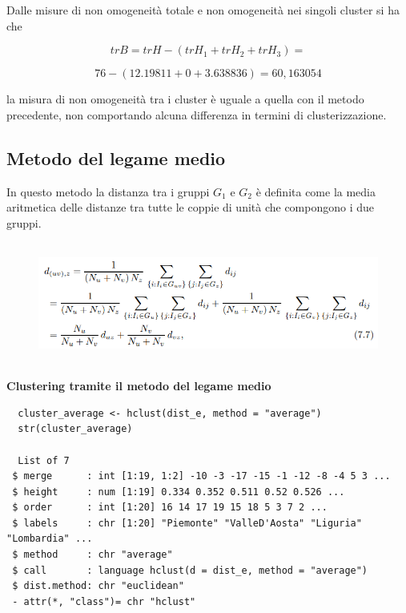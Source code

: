 Dalle misure di non omogeneità totale e non omogeneità nei singoli cluster si ha che

\[trB = trH - (trH_1 + trH_2 + trH_3) = \]

\[76 - (12.19811 + 0 + 3.638836) = 60,163054\]

\noindent la misura di non omogeneità tra i cluster è uguale a quella con il metodo precedente, non comportando alcuna differenza in termini di clusterizzazione.

\subsection{Metodo del legame medio}\label{cap5.2.3}

In questo metodo la distanza tra i gruppi $G_1$ e $G_2$ è definita come la media aritmetica delle distanze tra tutte le coppie di unità che compongono i due gruppi.

\vspace{5mm}
\begin{figure}[!htbp]
    \centering
    \includegraphics[height=4cm]{ProgettoSAD/capitoli/images/clustering/distanze_legMedio.png}
\end{figure}
\vspace{5mm}

\noindent \textbf{Clustering tramite il metodo del legame medio}

\vspace{5mm}
\begin{lstlisting}
  cluster_average <- hclust(dist_e, method = "average")
  str(cluster_average)

  List of 7
 $ merge      : int [1:19, 1:2] -10 -3 -17 -15 -1 -12 -8 -4 5 3 ...
 $ height     : num [1:19] 0.334 0.352 0.511 0.52 0.526 ...
 $ order      : int [1:20] 16 14 17 19 15 18 5 3 7 2 ...
 $ labels     : chr [1:20] "Piemonte" "ValleD'Aosta" "Liguria" "Lombardia" ...
 $ method     : chr "average"
 $ call       : language hclust(d = dist_e, method = "average")
 $ dist.method: chr "euclidean"
 - attr(*, "class")= chr "hclust"
\end{lstlisting}
\vspace{5mm}

